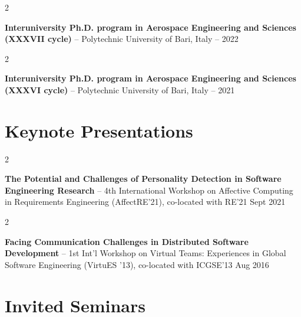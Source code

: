 \documentclass[10pt, a4paper]{article}
\newenvironment{twocolentry}[2][]{
    \onecolentry
    \def\secondColumn{#2}
    \setcolumnwidth{\fill, 4.5 cm}
    \begin{paracol}{2}
}{
    \switchcolumn \raggedleft \secondColumn
    \end{paracol}
    \endonecolentry
} %
\begin{document}
        \vspace{0.2 cm}

        \begin{twocolentry}{
            2021 – 2022
        }
            \textbf{Interuniversity Ph.D. program in Aerospace Engineering and Sciences (XXXVII cycle)} -- Polytechnic University of Bari, Italy\end{twocolentry}



        \vspace{0.2 cm}

        \begin{twocolentry}{
            2020 – 2021
        }
            \textbf{Interuniversity Ph.D. program in Aerospace Engineering and Sciences (XXXVI cycle)} -- Polytechnic University of Bari, Italy\end{twocolentry}




    
    \section{Keynote Presentations}



        
        \begin{twocolentry}{
            Sept 2021
        }
            \textbf{The Potential and Challenges of Personality Detection in Software Engineering Research} -- 4th International Workshop on Affective Computing in Requirements Engineering (AffectRE’21), co-located with RE’21\end{twocolentry}



        \vspace{0.2 cm}

        \begin{twocolentry}{
            Aug 2016
        }
            \textbf{Facing Communication Challenges in Distributed Software Development} -- 1st Int’l Workshop on Virtual Teams: Experiences in Global Software Engineering (VirtuES ’13), co-located with ICGSE’13\end{twocolentry}




    
    \section{Invited Seminars}
\end{document}
